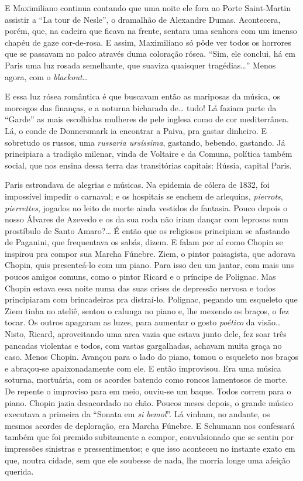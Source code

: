 E Maximiliano continua contando que uma noite ele fora ao Porte
Saint-Martin assistir a ``La tour de Nesle'', o dramalhão de Alexandre
Dumas. Acontecera, porém, que, na cadeira que ficava na frente, sentara
uma senhora com um imenso chapéu de gaze cor-de-rosa. E assim,
Maximiliano só pôde ver todos os horrores que se passavam no palco
através duma coloração rósea. ``Sim, ele conclui, há em Paris uma luz
rosada semelhante, que suaviza quaisquer tragédias\ldots{}'' Menos agora, com
o \textit{blackout}\ldots{}

E essa luz rósea romântica é que buscavam então as mariposas da música,
os morcegos das finanças, e a noturna bicharada de\ldots{} tudo! Lá faziam
parte da ``Garde'' as mais escolhidas mulheres de pele inglesa como de
cor mediterrânea. Lá, o conde de Donnersmark ia encontrar a Paiva, pra
gastar dinheiro. E sobretudo os russos, uma \textit{russaria ursíssima},
gastando, bebendo, gastando. Já principiara a tradição milenar, vinda de
Voltaire e da Comuna, política também social, que nos ensina dessa terra
das transitórias capitais: Rússia, capital Paris.

Paris estrondava de alegrias e músicas. Na epidemia de cólera de 1832,
foi impossível impedir o carnaval; e os hospitais se enchem de
arlequins, \textit{pierrots}, \textit{pierrettes}, jogados no leito de morte ainda
vestidos de fantasia. Pouco depois o nosso Álvares de Azevedo e os da
sua roda não iriam dançar com leprosas num prostíbulo de Santo Amaro?\ldots{}
É então que os religiosos principiam se afastando de Paganini, que
frequentava os sabás, dizem. E falam por aí como Chopin se inspirou pra
compor sua Marcha Fúnebre. Ziem, o pintor paisagista, que adorava
Chopin, quis presenteá-lo com um piano. Para isso deu um jantar, com
mais uns poucos amigos comuns, como o pintor Ricard e o príncipe de
Polignac. Mas Chopin estava essa noite numa das suas crises de depressão
nervosa e todos principiaram com brincadeiras pra distraí-lo. Polignac,
pegando um esqueleto que Ziem tinha no ateliê, sentou o calunga no piano
e, lhe mexendo os braços, o fez tocar. Os outros apagaram as luzes, para
aumentar o gosto \textit{poético} da visão\ldots{} Nisto, Ricard, aproveitando uma
arca vazia que estava junto dele, fez soar três pancadas violentas e
todos, com vastas gargalhadas, achavam muita graça no caso. Menos
Chopin. Avançou para o lado do piano, tomou o esqueleto nos braços e
abraçou-se apaixonadamente com ele. E então improvisou. Era uma música
soturna, mortuária, com os acordes batendo como roncos lamentosos de
morte. De repente o improviso para em meio, ouviu-se um baque. Todos
correm para o piano. Chopin jazia desacordado no chão. Poucos meses
depois, o grande músico executava a primeira da ``Sonata em \textit{si bemol}''.
Lá vinham, no andante, os mesmos acordes de deploração, era Marcha
Fúnebre. E Schumann nos confessará também que foi premido subitamente a
compor, convulsionado que se sentiu por impressões sinistras e
pressentimentos; e que isso aconteceu no instante exato em que, noutra
cidade, sem que ele soubesse de nada, lhe morria longe uma afeição
querida.

